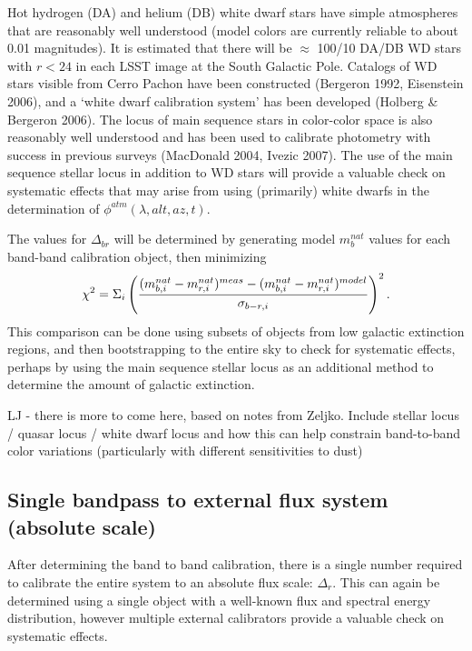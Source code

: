 \documentclass[12pt,preprint]{aastex}
\begin{document}
Hot hydrogen (DA) and helium (DB) white dwarf stars have simple
atmospheres that are reasonably well understood (model colors are
currently reliable to about 0.01 magnitudes). It is estimated that
there will be $\approx$ 100/10 DA/DB WD stars with $r<24$ in each LSST
image at the South Galactic Pole. Catalogs of WD stars visible from
Cerro Pachon have been constructed (Bergeron 1992, Eisenstein
2006), and a `white dwarf calibration system' has been developed
(Holberg \& Bergeron 2006). The locus of main sequence stars in
color-color space is also reasonably well understood and has been used
to calibrate photometry with success in previous surveys (MacDonald
2004, Ivezic 2007). The use of the main sequence stellar locus in addition to
WD stars will provide a valuable check on systematic effects that may
arise from using (primarily) white dwarfs in the determination of
$\phi^{atm}(\lambda,alt,az,t)$. 

The values for $\Delta_{br}$ will be determined by generating model
$m_b^{nat}$ values for each band-band calibration object, then
minimizing 
\begin{equation}
\chi^2 = \Sigma_{i} \left( { (m_{b,i}^{nat} - m_{r,i}^{nat})^{meas} - (m_{b,i}^{nat}
    - m_{r,i}^{nat})^{model} \over  \sigma_{b-r,i}}\right) ^2. 
\end{equation}
This comparison can
be done using subsets of objects from low galactic extinction regions,
and then bootstrapping to the entire sky to check for systematic
effects, perhaps by using the main sequence stellar locus as an
additional method to determine the amount of galactic extinction. 

LJ - there is more to come here, based on notes from Zeljko. Include 
stellar locus / quasar locus / white dwarf locus and how this 
can help constrain band-to-band color variations (particularly with
different sensitivities to dust)

\subsection{Single bandpass to external flux system (absolute scale)}

After determining the band to band calibration, there is a single
number required to calibrate the entire system to an absolute flux
scale: $\Delta_r$.  This can again be determined using a single
object with a well-known flux and spectral energy distribution,
however multiple external calibrators provide a valuable check on
systematic effects. 
\end{document}
